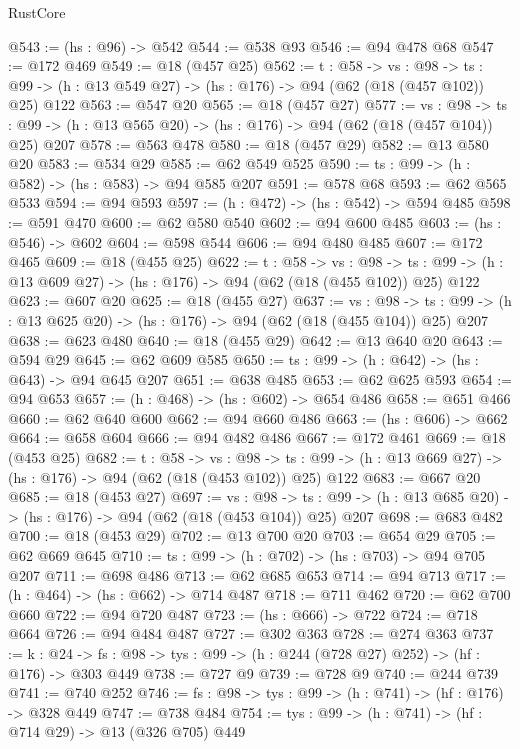 \begin{lexlean}{RustCore}
\begin{coremodule}
@543 := (hs : @96) -> @542
@544 := @538 @93
@546 := @94 @478 @68
@547 := @172 @469
@549 := @18 (@457 @25)
@562 := {t : @58} ->
  {vs : @98} ->
  {ts : @99} -> (h : @13 @549 @27) -> (hs : @176) -> @94 (@62 (@18 (@457 @102)) @25) @122
@563 := @547 @20
@565 := @18 (@457 @27)
@577 := {vs : @98} ->
  {ts : @99} -> (h : @13 @565 @20) -> (hs : @176) -> @94 (@62 (@18 (@457 @104)) @25) @207
@578 := @563 @478
@580 := @18 (@457 @29)
@582 := @13 @580 @20
@583 := @534 @29
@585 := @62 @549 @525
@590 := {ts : @99} -> (h : @582) -> (hs : @583) -> @94 @585 @207
@591 := @578 @68
@593 := @62 @565 @533
@594 := @94 @593
@597 := (h : @472) -> (hs : @542) -> @594 @485
@598 := @591 @470
@600 := @62 @580 @540
@602 := @94 @600 @485
@603 := (hs : @546) -> @602
@604 := @598 @544
@606 := @94 @480 @485
@607 := @172 @465
@609 := @18 (@455 @25)
@622 := {t : @58} ->
  {vs : @98} ->
  {ts : @99} -> (h : @13 @609 @27) -> (hs : @176) -> @94 (@62 (@18 (@455 @102)) @25) @122
@623 := @607 @20
@625 := @18 (@455 @27)
@637 := {vs : @98} ->
  {ts : @99} -> (h : @13 @625 @20) -> (hs : @176) -> @94 (@62 (@18 (@455 @104)) @25) @207
@638 := @623 @480
@640 := @18 (@455 @29)
@642 := @13 @640 @20
@643 := @594 @29
@645 := @62 @609 @585
@650 := {ts : @99} -> (h : @642) -> (hs : @643) -> @94 @645 @207
@651 := @638 @485
@653 := @62 @625 @593
@654 := @94 @653
@657 := (h : @468) -> (hs : @602) -> @654 @486
@658 := @651 @466
@660 := @62 @640 @600
@662 := @94 @660 @486
@663 := (hs : @606) -> @662
@664 := @658 @604
@666 := @94 @482 @486
@667 := @172 @461
@669 := @18 (@453 @25)
@682 := {t : @58} ->
  {vs : @98} ->
  {ts : @99} -> (h : @13 @669 @27) -> (hs : @176) -> @94 (@62 (@18 (@453 @102)) @25) @122
@683 := @667 @20
@685 := @18 (@453 @27)
@697 := {vs : @98} ->
  {ts : @99} -> (h : @13 @685 @20) -> (hs : @176) -> @94 (@62 (@18 (@453 @104)) @25) @207
@698 := @683 @482
@700 := @18 (@453 @29)
@702 := @13 @700 @20
@703 := @654 @29
@705 := @62 @669 @645
@710 := {ts : @99} -> (h : @702) -> (hs : @703) -> @94 @705 @207
@711 := @698 @486
@713 := @62 @685 @653
@714 := @94 @713
@717 := (h : @464) -> (hs : @662) -> @714 @487
@718 := @711 @462
@720 := @62 @700 @660
@722 := @94 @720 @487
@723 := (hs : @666) -> @722
@724 := @718 @664
@726 := @94 @484 @487
@727 := @302 @363
@728 := @274 @363
@737 := {k : @24} ->
  {fs : @98} -> {tys : @99} -> (h : @244 (@728 @27) @252) -> (hf : @176) -> @303 @449
@738 := @727 @9
@739 := @728 @9
@740 := @244 @739
@741 := @740 @252
@746 := {fs : @98} -> {tys : @99} -> (h : @741) -> (hf : @176) -> @328 @449
@747 := @738 @484
@754 := {tys : @99} -> (h : @741) -> (hf : @714 @29) -> @13 (@326 @705) @449

\end{coremodule}
\end{lexlean}
